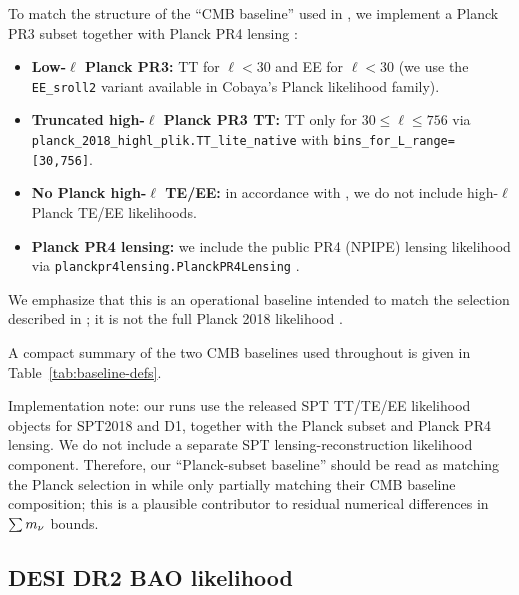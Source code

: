 To match the structure of the ``CMB baseline'' used in \cite{arxiv2601_16277}, we implement a Planck PR3 subset together with Planck PR4 lensing \cite{planck2018_likelihood}:
\begin{itemize}[leftmargin=*, itemsep=2pt]
  \item \textbf{Low-$\ell$ Planck PR3:} TT for $\ell<30$ and EE for $\ell<30$ (we use the \texttt{EE\_sroll2} variant available in Cobaya's Planck likelihood family).
  \item \textbf{Truncated high-$\ell$ Planck PR3 TT:} TT only for $30\le \ell\le 756$ via \texttt{planck\_2018\_highl\_plik.TT\_lite\_native} with \texttt{bins\_for\_L\_range=[30,756]}.
  \item \textbf{No Planck high-$\ell$ TE/EE:} in accordance with \cite{arxiv2601_16277}, we do not include high-$\ell$ Planck TE/EE likelihoods.
  \item \textbf{Planck PR4 lensing:} we include the public PR4 (NPIPE) lensing likelihood via \texttt{planckpr4lensing.PlanckPR4Lensing} \cite{planck_pr4_lensing,planck_pr4_lensing_maps}.
\end{itemize}
We emphasize that this is an operational baseline intended to match the selection described in \cite{arxiv2601_16277}; it is not the full Planck 2018 likelihood \cite{planck2018_cosmoparams}.

A compact summary of the two CMB baselines used throughout is given in Table~\ref{tab:baseline-defs}.

\begin{table}[t]
  \centering
  \caption{Baseline definitions as described in \cite{arxiv2601_16277} (CMB and CMB-D1). In our implementation we match the Planck-subset + PR4 lensing structure and swap only the SPT TT/TE/EE likelihood release; see text for any deviations.}
  \label{tab:baseline-defs}
  \small
  
\end{table}

Implementation note: our runs use the released SPT TT/TE/EE likelihood objects for SPT2018 and D1, together with the Planck subset and Planck PR4 lensing. We do not include a separate SPT lensing-reconstruction likelihood component. Therefore, our ``Planck-subset baseline'' should be read as matching the Planck selection in \cite{arxiv2601_16277} while only partially matching their CMB baseline composition; this is a plausible contributor to residual numerical differences in $\sum m_\nu$ bounds.

\subsection{DESI DR2 BAO likelihood}
\label{sec:desi-bao}

